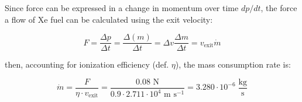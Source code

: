 \documentclass{template}
\begin{document}
Since force can be expressed in a change in momentum over time $dp/dt$, the force a flow of Xe fuel can be calculated using the exit velocity:

\begin{equation}
    F = \frac{\Delta p}{\Delta t} = \frac{\Delta (m)}{\Delta t} = \Delta v \frac{\Delta m}{\Delta t} = v_{\text{exit}} \dot{m}
\end{equation}

then, accounting for ionization efficiency (def. $\eta$), the mass consumption rate is:

\begin{equation}
    \boxed{\dot{m} = \frac{F}{\eta \cdot v_{\text{exit}} } = \frac{0.08\text{ N}}{0.9 \cdot 2.711 \cdot 10^4 \text{ m s}^{-1}} = 3.280 \cdot 10^{-6} \; \frac{\text{kg}}{\text{s}}}
\end{equation}




% 
% 
\end{document}
